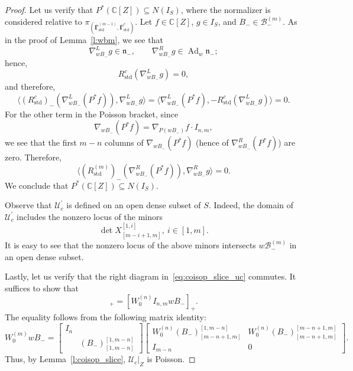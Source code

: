 \documentclass[11pt]{article}
\newcommand{\bbg}{\bar{\mathbf{\Gamma}}}
\newcommand{\std}{\mathrm{std}}
\DeclareMathOperator{\Ad}{Ad}
\theoremstyle{definition}\newtheorem{definition}[theorem]{Definition}
\theoremstyle{definition}\newtheorem{remark}[theorem]{Remark}
\theoremstyle{remark}
\numberwithin{equation}{section}
\begin{document}
\begin{proof}
    Let us verify that $P^*(\mathbb{C}[Z]) \subseteq N(I_S)$, where the normalizer is considered relative to $\pi_{(\bbg_{\std}^{(m-1)},\bbg^c_{\std})}$. Let $f \in \mathbb{C}[Z]$, $g \in I_S$, and $B_- \in \mathcal{B}_-^{(m)}$. As in the proof of Lemma~\ref{l:wbm}, we see that
    \begin{equation*}
        \nabla^L_{wB_-}g \in \mathfrak{n}_-, \qquad \nabla^R_{wB_-}g \in \Ad_w\mathfrak{n}_-;
    \end{equation*}
    hence, 
    \begin{equation*}
        R^{c}_{\std}(\nabla^L_{wB_-}g) = 0,
    \end{equation*}
    and therefore,
    \begin{equation*}
        \langle (R^{c}_{\std})_-(\nabla^L_{wB_-}(P^*f)),\nabla^L_{wB_-}g \rangle =\langle \nabla^L_{wB_-}(P^*f), -R^{c}_{\std}(\nabla^L_{wB_-}g)\rangle =  0.
    \end{equation*}
    For the other term in the Poisson bracket, since 
    \begin{equation*}
        \nabla_{wB_-}(P^*f) = \nabla_{P(wB_-)}f \cdot I_{n,m},
    \end{equation*}
    we see that the first $m-n$ columns of $\nabla_{wB_-}(P^*f)$ (hence of $\nabla^R_{wB_-}(P^*f)$) are zero. Therefore, 
    \begin{equation*}
        \langle (R^{(m)}_{\std})_-(\nabla^R_{wB_-}(P^*f)), \nabla^R_{wB_-}g \rangle = 0.
    \end{equation*}
    We conclude that $P^*(\mathbb{C}[Z]) \subseteq N(I_S)$.

    Observe that $\mathcal{U}_c^\prime$ is defined on an open dense subset of $S$. Indeed, the domain of $\mathcal{U}_c^\prime$ includes the nonzero locus of the minors
    \begin{equation*}
        \det X^{[1,i]}_{[m-i+1,m]}, \ i \in [1,m].
    \end{equation*}
    It is easy to see that the nonzero locus of the above minors intersects $w\mathcal{B}_-^{(m)}$ in an open dense subset.

    Lastly, let us verify that the right diagram in~\eqref{eq:coisop_slice_uc} commutes. It suffices to show that
    \begin{equation*}
        [W_0^{(m)} w B_-]_+ = [W_0^{(n)}I_{n,m}wB_-]_+.
    \end{equation*}
    The equality follows from the following matrix identity:
    \begin{equation*}
        W_0^{(m)}wB_- = \begin{bmatrix}
            I_n & \\
            & (B_-)_{[1,m-n]}^{[1,m-n]}
        \end{bmatrix}
        \begin{bmatrix}
            W_0^{(n)} (B_-)_{[m-n+1,m]}^{[1,m-n]} & W_0^{(n)} (B_-)_{[m-n+1,m]}^{[m-n+1,m]}\\
            I_{m-n} & 0
        \end{bmatrix}.
    \end{equation*}
    Thus, by Lemma~\ref{l:coisop_slice}, $\mathcal{U}_c|_Z$ is Poisson.
\end{proof}
\end{document}
